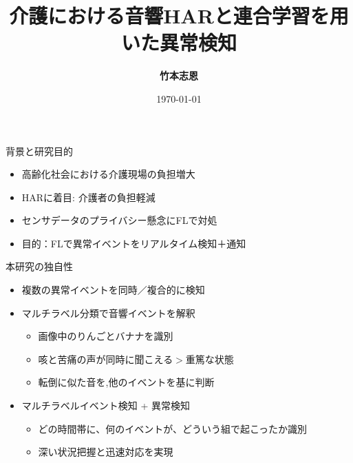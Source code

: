 \documentclass[unicode,12pt,aspectratio=169,dvipdfmx]{beamer}
\title{\textbf{介護における音響HARと連合学習を用いた異常検知}}
\author{\textbf{竹本志恩}}
\institute{\textbf{INIAD}}
\date{\today}
\begin{document}
\begin{frame}
  \titlepage
\end{frame}
\begin{frame}{背景と研究目的}
  \begin{itemize}
    \item 高齢化社会における介護現場の負担増大
    \item HARに着目: 介護者の負担軽減
    \item センサデータのプライバシー懸念にFLで対処
    \item 目的：FLで異常イベントをリアルタイム検知＋通知
  \end{itemize}
\end{frame}
\begin{frame}{本研究の独自性}
  \begin{itemize}
    \item 複数の異常イベントを同時／複合的に検知
    \item マルチラベル分類で音響イベントを解釈
    \begin{itemize}
        \item 画像中のりんごとバナナを識別
        \item 咳と苦痛の声が同時に聞こえる$>$重篤な状態
        \item 転倒に似た音を,他のイベントを基に判断
    \end{itemize}
    \item マルチラベルイベント検知 + 異常検知
    \begin{itemize}
        \item どの時間帯に、何のイベントが、どういう組で起こったか識別
        \item 深い状況把握と迅速対応を実現
    \end{itemize}


  \end{itemize}
\end{frame}
\end{document}
